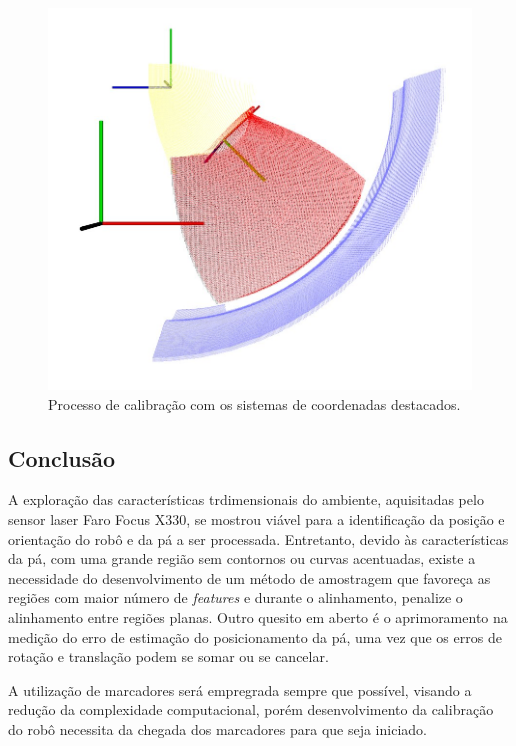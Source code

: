 \begin{figure}[h!]
	\centering
	\includegraphics[width=0.9\columnwidth]{method/figs/calibracao/tf_error}
	\caption{Processo de calibração com os sistemas de coordenadas destacados.}
    \label{fig::tf_error}
\end{figure}

\subsection{Conclusão}

A exploração das características trdimensionais do ambiente,
aquisitadas pelo sensor laser Faro Focus X330, se mostrou viável para a identificação da posição
e orientação do robô e da pá a ser processada. Entretanto, devido às
características da pá, com uma grande região sem contornos ou curvas acentuadas,
existe a necessidade do desenvolvimento de um método de amostragem que favoreça as regiões com maior número de \textit{features} e durante o
alinhamento, penalize o alinhamento entre regiões planas. Outro quesito em
aberto é o aprimoramento na medição do erro de estimação do posicionamento da
pá, uma vez que os erros de rotação e translação podem se somar ou se cancelar.

A utilização de marcadores será empregrada sempre que possível, visando a
redução da complexidade computacional, porém desenvolvimento da calibração do
robô necessita da chegada dos marcadores para que seja iniciado.




